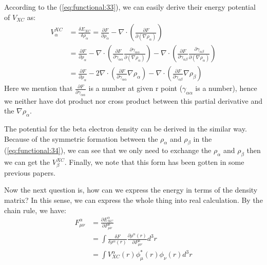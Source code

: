 According to the (\ref{eq:functional:33}), we can easily derive their
energy potential of $V_{XC}$ as:
\begin{align}
  \label{eq:functional:36}
  V_{\alpha}^{XC} &= \frac{\delta E_{XC}} {\delta \rho_{\alpha}} =
  \frac{\partial F} {\partial \rho_{\alpha}} - \nabla\cdot \left(
    \frac{\partial F}{\partial (\nabla\rho_{\alpha})}
  \right) \nonumber \\
  &= \frac{\partial F}{\partial \rho_{\alpha}} - \nabla\cdot \left(
    \frac{\partial F}{\partial \gamma_{\alpha\alpha}}\frac{\partial
      \gamma_{\alpha\alpha}} {\partial (\nabla\rho_{\alpha})} \right)-
  \nabla\cdot \left( \frac{\partial F}{\partial
      \gamma_{\alpha\beta}}\frac{\partial \gamma_{\alpha\beta}}
    {\partial (\nabla\rho_{\alpha})} \right)
  \nonumber \\
  &= \frac{\partial F}{\partial \rho_{\alpha}} - 2\nabla\cdot \left(
    \frac{\partial F} {\partial \gamma_{\alpha\alpha}}
    \nabla\rho_{\alpha}\right) - \nabla\cdot \left( \frac{\partial F}
    {\partial \gamma_{\alpha\beta}} \nabla\rho_{\beta} \right)
\end{align}
Here we mention that $\frac{\partial F} {\partial
\gamma_{\alpha\alpha}}$ is a number at given r point
($\gamma_{\alpha\alpha}$ is a number), hence we neither have dot
product nor cross product between this partial derivative and the
$\nabla\rho_{\alpha}$.

The potential for the beta electron density can be derived in the
similar way. Because of the symmetric formation between the
$\rho_{\alpha}$ and $\rho_{\beta}$ in the (\ref{eq:functional:34}), we
can see that we only need to exchange the $\rho_{\alpha}$ and
$\rho_{\beta}$ then we can get the $V_{\beta}^{XC}$. Finally, we
note that this form has been gotten in some
previous papers\cite{CPL_1992_6_557,johnson:5612}.

Now the next question is, how can we express the energy in terms of
the density matrix? In this sense, we can express the whole thing
into real calculation. By the chain rule, we have:
\begin{align}
  \label{eq:XC_functional.9}
F^{\alpha}_{\mu\nu} &= \frac{\partial E^{\alpha}_{XC}}{\partial
P^{\alpha}_{\mu\nu}}
\nonumber \\
&=
\int \frac{\delta F}{\delta
  \rho^{\alpha}(r)}\frac{\partial \rho^{\alpha}(r)}{\partial
P^{\alpha}_{\mu\nu}} d^{3}r
\nonumber \\
&= \int V^{\alpha}_{XC}(r) \phi^{*}_{\mu}(r)\phi_{\nu}(r) d^{3}r
\end{align}

